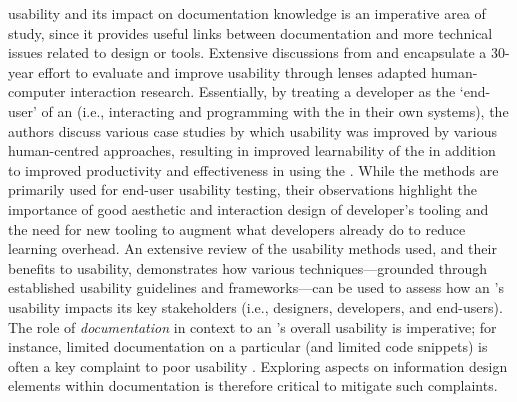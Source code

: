  usability and its impact on documentation knowledge is an imperative area of study, since it provides useful links between  documentation and more technical issues related to  design or tools. Extensive discussions from \citet{myersstylos2016} and \mbox{\citet{7503516}} encapsulate a 30-year effort to evaluate and improve  usability through lenses adapted human-computer interaction research. Essentially, by treating a developer as the `end-user' of an  (i.e., interacting and programming with the  in their own systems), the authors discuss various case studies by which  usability was improved by various human-centred approaches, resulting in improved learnability of the  in addition to improved productivity and effectiveness in using the . While the methods are primarily used for end-user usability testing, their observations highlight the importance of good aesthetic and interaction design of developer's tooling and the need for new tooling to augment what developers already do to reduce learning overhead. An extensive review of the usability methods used, and their benefits to  usability, demonstrates how various techniques---grounded through established usability guidelines and frameworks---can be used to assess how an 's usability impacts its key stakeholders (i.e.,  designers, developers, and end-users). The role of  \textit{documentation} in context to an 's overall usability is imperative; for instance, limited documentation on a particular  (and limited code snippets) is often a key complaint to poor  usability \citep{myersstylos2016}. Exploring aspects on information design elements within  documentation is therefore critical to mitigate such complaints.

